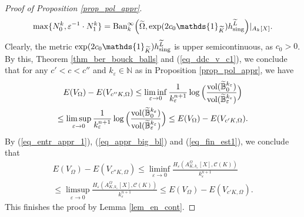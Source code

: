 \documentclass[12pt]{article}
\numberwithin{equation}{section}
\theoremstyle{theorem}
\theoremstyle{definition}
\theoremstyle{remark}
\newcommand{\nat}{\mathbb{N}}
\begin{document}
\begin{proof}[Proof of Proposition \ref{prop_pol_appr}]
		\begin{equation}
			\max \{ N_0^k, \varepsilon^{-1} \cdot N_1^k \}
			=
			\textrm{Ban}_k^{\infty} \Big(\widetilde{\Omega}, \exp(2 c_0 \mathds{1}_{\widetilde{K}}) h^{\widetilde{L}}_{{\rm{sing}}} \Big)|_{A_k[X]}.
		\end{equation}
		Clearly, the metric $\exp(2 c_0 \mathds{1}_{\widetilde{K}}) h^{\widetilde{L}}_{{\rm{sing}}}$ is upper semicontinuous, as $c_0 > 0$.
		By this, Theorem \ref{thm_ber_bouck_balls} and (\ref{eq_ddc_v_c1}), we conclude that for any $c' < c < c''$ and $k_{\varepsilon} \in \nat$ as in Proposition \ref{prop_pol_appr}, we have
		\begin{multline}\label{eq_fin_est1}
			E(V_{\Omega}) - E(V_{c'' K, \Omega})
			\leq
			\liminf_{\varepsilon \to 0}
			\frac{1}{k_{\varepsilon}^{n + 1}}
			\log \Big( 
			\frac{{\rm{vol}}(\widetilde{\mathbb{B}}_{0}^{k_{\varepsilon}})}{{\rm{vol}}(\widetilde{\mathbb{B}}_{\varepsilon}^{k_{\varepsilon}})}
			\Big)
			\\
			\leq
			\limsup_{\varepsilon \to 0}
			\frac{1}{k_{\varepsilon}^{n + 1}}
			\log \Big( 
			\frac{{\rm{vol}}(\widetilde{\mathbb{B}}_{0}^{k_{\varepsilon}})}{{\rm{vol}}(\widetilde{\mathbb{B}}_{\varepsilon}^{k_{\varepsilon}})}
			\Big)
			\leq
			E(V_{\Omega}) - E(V_{c' K, \Omega}).
		\end{multline}
		By (\ref{eq_entr_appr_1}), (\ref{eq_appr_big_bl}) and (\ref{eq_fin_est1}), we conclude that
		\begin{multline}
			E(V_{\Omega}) - E(V_{c'' K, \Omega})
			\leq
			\liminf_{\varepsilon \to 0}
			\frac{H_{\varepsilon}(A_{K, k_{\varepsilon}}^{\Omega}[X], \mathscr{C}(K))}{k_{\varepsilon}^{n + 1}}
			\\
			\leq
			\limsup_{\varepsilon \to 0}
			\frac{H_{\varepsilon}(A_{K, k_{\varepsilon}}^{\Omega}[X], \mathscr{C}(K))}{k_{\varepsilon}^{n + 1}}
			\leq
			E(V_{\Omega}) - E(V_{c' K, \Omega}).
		\end{multline}
		This finishes the proof by Lemma \ref{lem_en_cont}.
	\end{proof}
	
	
\end{document}
